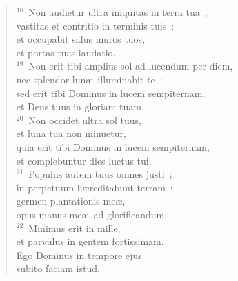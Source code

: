 \begin{verse}
${}^{18}$~Non audietur ultra iniquitas in terra tua~;\\ vastitas et contritio in terminis tuis~:\\ et occupabit salus muros tuos,\\ et portas tuas laudatio.\\
${}^{19}$~Non erit tibi amplius sol ad lucendum per diem,\\ nec splendor lun\ae\ illuminabit te~:\\ sed erit tibi Dominus in lucem sempiternam,\\ et Deus tuus in gloriam tuam.\\
${}^{20}$~Non occidet ultra sol tuus,\\ et luna tua non minuetur,\\ quia erit tibi Dominus in lucem sempiternam,\\ et complebuntur dies luctus tui.\\
${}^{21}$~Populus autem tuus omnes justi~;\\ in perpetuum h\ae reditabunt terram~:\\ germen plantationis me\ae ,\\ opus manus me\ae\ ad glorificandum.\\
${}^{22}$~Minimus erit in mille,\\ et parvulus in gentem fortissimam.\\ Ego Dominus in tempore ejus\\ subito faciam istud.\end{verse}


